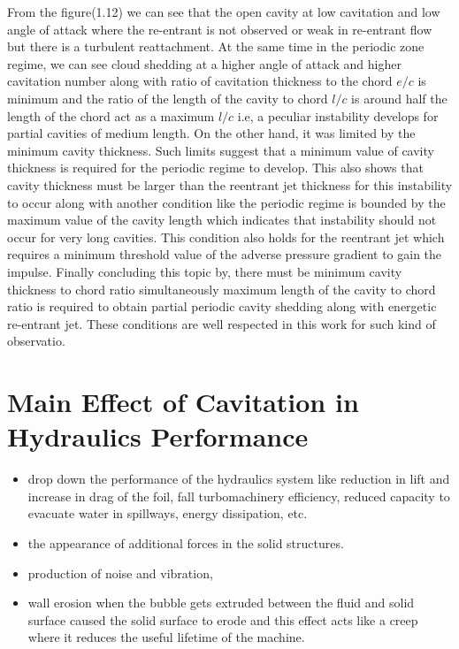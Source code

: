 From the figure(1.12) we can see that the open cavity at low cavitation and low angle of attack where the re-entrant is not observed or weak in re-entrant flow but there is a turbulent reattachment. At the
same time in the periodic zone regime, we can see cloud shedding at a higher angle of attack and higher cavitation number along with ratio of cavitation thickness to the chord $e/c$ is minimum and 
the ratio of the length of the cavity to chord $l/c$ is around half the length of the chord act as a maximum $l/c$ i.e, a peculiar instability develops for partial cavities of medium length. On the other hand, it was limited 
by the minimum cavity thickness. Such limits suggest that a minimum value of cavity thickness is required for the periodic regime to develop. This also shows that cavity thickness must 
be larger than the reentrant jet thickness for this instability to occur along with another condition like the periodic regime is bounded by the maximum value of the cavity length which indicates that instability 
should not occur for very long cavities. This condition also holds for the reentrant jet which requires a minimum threshold value of the adverse pressure gradient to gain the impulse. Finally concluding this topic by, 
there must be minimum cavity thickness to chord ratio simultaneously maximum length of the cavity to chord ratio is required to obtain partial periodic cavity shedding along with energetic re-entrant jet. These conditions are 
well respected in this work for such kind of observatio.\\
\section{Main Effect of Cavitation in Hydraulics Performance}
\begin{itemize}
\item drop down the performance of the hydraulics system like reduction in lift and increase in drag of the foil, fall turbomachinery efficiency, reduced capacity to evacuate water in spillways, energy 
dissipation, etc.
\item the appearance of additional forces in the solid structures.
\item production of noise and vibration,
\item wall erosion when the bubble gets extruded between the fluid and solid surface caused the solid surface to erode and this effect  acts like a creep where it reduces the useful lifetime of the machine.
\end{itemize}


